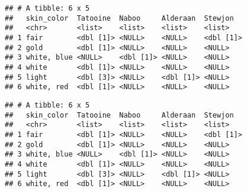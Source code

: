 \documentclass[]{book}
\newenvironment{Shaded}{\begin{snugshade}}{\end{snugshade}}
\newcommand{\DataTypeTok}[1]{\textcolor[rgb]{0.13,0.29,0.53}{#1}}
\newcommand{\DecValTok}[1]{\textcolor[rgb]{0.00,0.00,0.81}{#1}}
\newcommand{\KeywordTok}[1]{\textcolor[rgb]{0.13,0.29,0.53}{\textbf{#1}}}
\newcommand{\NormalTok}[1]{#1}
\newcommand{\OperatorTok}[1]{\textcolor[rgb]{0.81,0.36,0.00}{\textbf{#1}}}
\newcommand{\StringTok}[1]{\textcolor[rgb]{0.31,0.60,0.02}{#1}}
\begin{document}
\begin{Shaded}
\end{Shaded}

\begin{verbatim}
## # A tibble: 6 x 5
##   skin_color  Tatooine  Naboo     Alderaan  Stewjon  
##   <chr>       <list>    <list>    <list>    <list>   
## 1 fair        <dbl [1]> <NULL>    <NULL>    <dbl [1]>
## 2 gold        <dbl [1]> <NULL>    <NULL>    <NULL>   
## 3 white, blue <NULL>    <dbl [1]> <NULL>    <NULL>   
## 4 white       <dbl [1]> <NULL>    <NULL>    <NULL>   
## 5 light       <dbl [3]> <NULL>    <dbl [1]> <NULL>   
## 6 white, red  <dbl [1]> <NULL>    <NULL>    <NULL>
\end{verbatim}

\begin{Shaded}
\end{Shaded}

\begin{verbatim}
## # A tibble: 6 x 5
##   skin_color  Tatooine  Naboo     Alderaan  Stewjon  
##   <chr>       <list>    <list>    <list>    <list>   
## 1 fair        <dbl [1]> <NULL>    <NULL>    <dbl [1]>
## 2 gold        <dbl [1]> <NULL>    <NULL>    <NULL>   
## 3 white, blue <NULL>    <dbl [1]> <NULL>    <NULL>   
## 4 white       <dbl [1]> <NULL>    <NULL>    <NULL>   
## 5 light       <dbl [3]> <NULL>    <dbl [1]> <NULL>   
## 6 white, red  <dbl [1]> <NULL>    <NULL>    <NULL>
\end{verbatim}

\begin{Shaded}
\end{Shaded}
\end{document}
